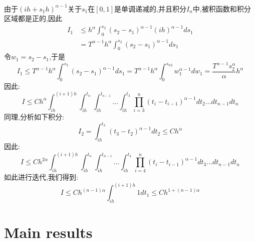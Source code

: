 \documentclass[12pt,final]{article}
\makeatletter
\theoremstyle{plain}
\renewcommand{\proofname}{Proof}
\theoremstyle{Definition}
\theoremstyle{Remark}
\renewenvironment{proof}[1][\proofname]{\par
	\pushQED{\qed}%
	\normalfont \topsep6\p@\@plus6\p@\relax
	\trivlist\item[\hskip\labelsep
	\bfseries #1\@addpunct{\,:\,}]\ignorespaces
}{%
	\popQED\endtrivlist\@endpefalse
}
\makeatother
\begin{document}
\begin{proof}
\begin{align*}
		\end{align*}
		由于$(ih + s_1h)^{\alpha - 1}$关于$s_1$在$[0,1]$是单调递减的,并且积分$I_n$中,被积函数和积分区域都是正的,因此
		\begin{align*}
			I_1 &\le h^{\alpha}\int_{0}^{s_{2}} (s_{2}-s_{1})^{\alpha -1} (ih)^{\alpha - 1} ds_1 \\
			&=  T^{\alpha - 1}h^{\alpha}\int_{0}^{s_{2}} (s_{2}-s_{1})^{\alpha -1} ds_1
		\end{align*}
		令$w_1=s_{2}-s_{1}$,于是
		\begin{equation*}
			I_1\le T^{\alpha - 1}h^{\alpha}\int_{0}^{s_{2}} (s_{2}-s_{1})^{\alpha -1} ds_1
			=  T^{\alpha - 1}h^{\alpha}\int_{0}^{s_{n2}} w_1^{\alpha -1} dw_1
			=  \frac{T^{\alpha - 1}s_{2}^\alpha}{\alpha}h^{\alpha}
		\end{equation*}
		因此:
		\begin{equation*}
			I \le Ch^\alpha
			\int_{ih}^{(i+1)h}\int_{ih}^{t_n}\int_{ih}^{t_{n-1}} \ldots \int_{ih}^{t_{3}} 
			\prod_{i=3}^{n}(t_i-t_{i-1})^{\alpha -1} dt_{2} \ldots dt_{n-1}dt_n
		\end{equation*}
		同理,分析如下积分:
		\begin{equation*}
			I_{2} = \int_{ih}^{t_{3}}(t_{3}-t_{2})^{\alpha -1}
			dt_{2} \le Ch^\alpha 
		\end{equation*}
		因此:
		\begin{equation*}
			I \le Ch^{2\alpha}
			\int_{ih}^{(i+1)h}\int_{ih}^{t_n}\int_{ih}^{t_{n-1}} \ldots \int_{ih}^{t_{4}} 
			\prod_{i=4}^{n}(t_i-t_{i-1})^{\alpha -1} dt_{3} \ldots dt_{n-1}dt_n
		\end{equation*}
		如此进行迭代,我们得到:
		\begin{equation*}
			I \le Ch^{(n-1)\alpha}\int_{ih}^{(i+1)h} 1 dt_1 \le Ch^{1+(n-1)\alpha}
		\end{equation*}
	\end{proof}
	
	\section{Main results}
	
\end{document}
